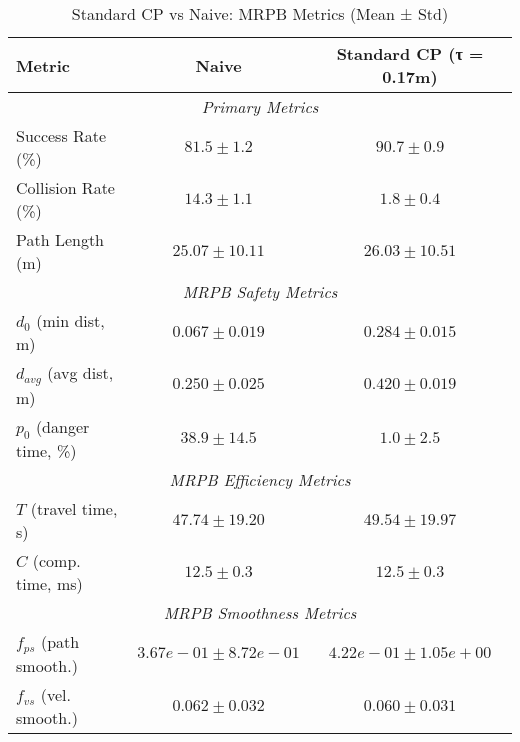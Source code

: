 
\begin{table}[h]
\centering
\caption{Standard CP vs Naive: MRPB Metrics (Mean ± Std)}
\begin{tabular}{lcc}
\hline
\textbf{Metric} & \textbf{Naive} & \textbf{Standard CP (τ = 0.17m)} \\
\hline
\multicolumn{3}{c}{\textit{Primary Metrics}} \\
Success Rate (\%) & $81.5 \pm 1.2$ & $90.7 \pm 0.9$ \\
Collision Rate (\%) & $14.3 \pm 1.1$ & $1.8 \pm 0.4$ \\
Path Length (m) & $25.07 \pm 10.11$ & $26.03 \pm 10.51$ \\
\hline
\multicolumn{3}{c}{\textit{MRPB Safety Metrics}} \\
$d_0$ (min dist, m) & $0.067 \pm 0.019$ & $0.284 \pm 0.015$ \\
$d_{avg}$ (avg dist, m) & $0.250 \pm 0.025$ & $0.420 \pm 0.019$ \\
$p_0$ (danger time, \%) & $38.9 \pm 14.5$ & $1.0 \pm 2.5$ \\
\hline
\multicolumn{3}{c}{\textit{MRPB Efficiency Metrics}} \\
$T$ (travel time, s) & $47.74 \pm 19.20$ & $49.54 \pm 19.97$ \\
$C$ (comp. time, ms) & $12.5 \pm 0.3$ & $12.5 \pm 0.3$ \\
\hline
\multicolumn{3}{c}{\textit{MRPB Smoothness Metrics}} \\
$f_{ps}$ (path smooth.) & $3.67e-01 \pm 8.72e-01$ & $4.22e-01 \pm 1.05e+00$ \\
$f_{vs}$ (vel. smooth.) & $0.062 \pm 0.032$ & $0.060 \pm 0.031$ \\
\hline
\end{tabular}
\end{table}
